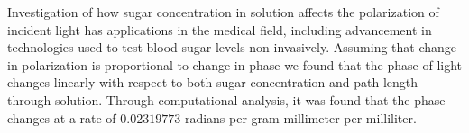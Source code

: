 Investigation of how sugar concentration in solution affects the polarization of incident light has applications in the medical field, including advancement in technologies used to test blood sugar levels non-invasively. Assuming that change in polarization is proportional to change in phase we found that the phase of light changes linearly with respect to both sugar concentration and path length through solution. Through computational analysis, it was found that the phase changes at a rate of $0.02319773$ radians per gram millimeter per milliliter.